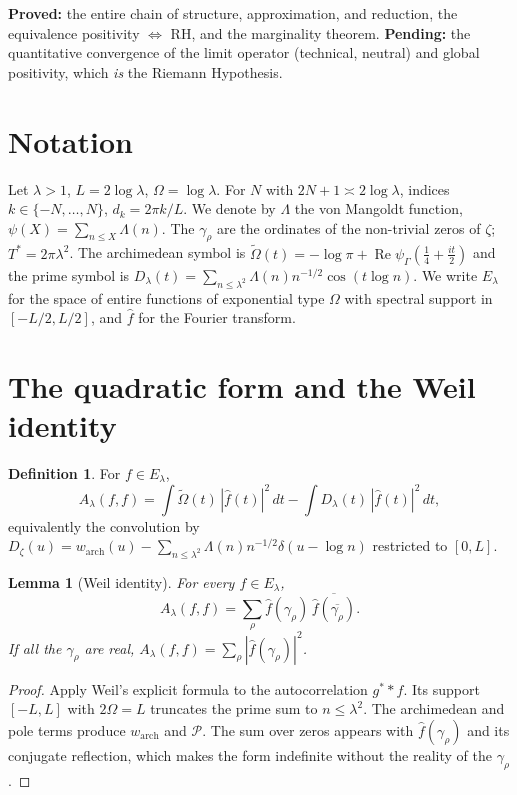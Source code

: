\documentclass[11pt]{amsart}
\newtheorem{lemma}[theorem]{Lemma}
\theoremstyle{definition}
\newtheorem{definition}[theorem]{Definition}
\theoremstyle{remark}
\newcommand{\Om}{\widetilde\Omega}
\begin{document}
\medskip
\noindent\textbf{Proved:} the entire chain of structure, approximation, and reduction, the
equivalence positivity $\iff$ RH, and the marginality theorem.
\textbf{Pending:} the quantitative convergence of the limit operator (technical, neutral) and
global positivity, which \emph{is} the Riemann Hypothesis.

\section{Notation}
Let $\lambda>1$, $L=2\log\lambda$, $\Omega=\log\lambda$. For $N$ with $2N+1\asymp 2\log\lambda$,
indices $k\in\{-N,\dots,N\}$, $d_k=2\pi k/L$. We denote by $\Lambda$ the von Mangoldt function,
$\psi(X)=\sum_{n\le X}\Lambda(n)$. The $\gamma_\rho$ are the ordinates of the non-trivial zeros
of $\zeta$; $T^*=2\pi\lambda^2$. The archimedean symbol is
$\Om(t)=-\log\pi+\operatorname{Re}\psi_\Gamma(\tfrac14+\tfrac{it}{2})$ and the prime symbol is
$D_\lambda(t)=\sum_{n\le\lambda^2}\Lambda(n)n^{-1/2}\cos(t\log n)$. We write $E_\lambda$ for
the space of entire functions of exponential type $\Omega$ with spectral support in
$[-L/2,L/2]$, and $\hat f$ for the Fourier transform.

\section{The quadratic form and the Weil identity}

\begin{definition}
For $f\in E_\lambda$,
\[
A_\lambda(f,f)=\int \Om(t)\,|\hat f(t)|^2\,dt-\int D_\lambda(t)\,|\hat f(t)|^2\,dt,
\]
equivalently the convolution by
$D_\zeta(u)=w_{\mathrm{arch}}(u)-\sum_{n\le\lambda^2}\Lambda(n)n^{-1/2}\delta(u-\log n)$
restricted to $[0,L]$.
\end{definition}

\begin{lemma}[Weil identity]
For every $f\in E_\lambda$,
\[
A_\lambda(f,f)=\sum_\rho \hat f(\gamma_\rho)\,\overline{\hat f(\overline{\gamma_\rho})}.
\]
If all the $\gamma_\rho$ are real, $A_\lambda(f,f)=\sum_\rho|\hat f(\gamma_\rho)|^2$.
\end{lemma}
\begin{proof}
Apply Weil's explicit formula to the autocorrelation $g^**f$. Its support $[-L,L]$ with
$2\Omega=L$ truncates the prime sum to $n\le\lambda^2$. The archimedean and pole terms
produce $w_{\mathrm{arch}}$ and $\mathcal P$. The sum over zeros appears with $\hat f(\gamma_\rho)$
and its conjugate reflection, which makes the form indefinite without the reality of the
$\gamma_\rho$.
\end{proof}
\end{document}
